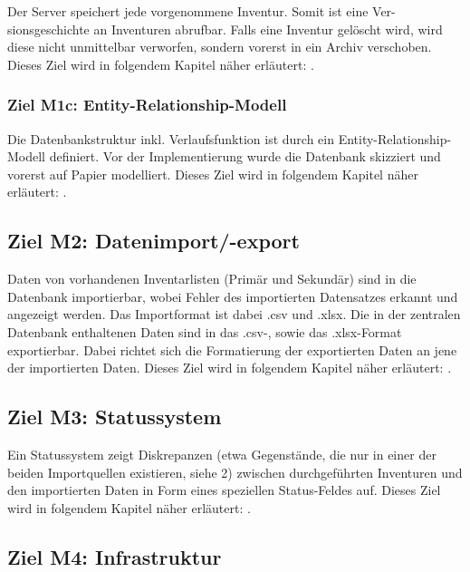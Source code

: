 \documentclass[
    headings=optiontotocandhead,%
    twoside,
    numbers=noenddot,%
    toc=flat, %
    12pt, %
    titlepage, %
    parskip=full, %
    listof=totoc, %
    listof=flat, %
    numbers=noenddot, %
    bibliography=totoc, %
    a4paper,DIV=14,
    BCOR=15mm,
]{scrbook}
\begin{document}
  Der Server speichert jede vorgenommene Inventur. Somit ist eine Ver-sionsgeschichte an Inventuren abrufbar. Falls eine Inventur gelöscht wird, wird diese nicht unmittelbar verworfen, sondern vorerst in ein Archiv verschoben.
  Dieses Ziel wird in folgendem Kapitel näher erläutert: .
  
  \subsubsection*{Ziel M1c: Entity-Relationship-Modell}

  Die Datenbankstruktur inkl. Verlaufsfunktion ist durch ein Entity-Relationship-Modell definiert. Vor der Implementierung wurde die Datenbank skizziert und vorerst auf Papier modelliert. 
  Dieses Ziel wird in folgendem Kapitel näher erläutert: .



  \subsection*{Ziel M2: Datenimport/-export}

    Daten von vorhandenen Inventarlisten (Primär und Sekundär) sind in die Datenbank importierbar, wobei Fehler des importierten Datensatzes erkannt und angezeigt werden. Das Importformat ist dabei .csv und .xlsx. 
    Die in der zentralen Datenbank enthaltenen Daten sind in das .csv-, sowie das .xlsx-Format exportierbar. Dabei richtet sich die Formatierung der exportierten Daten an jene der importierten Daten. 
    Dieses Ziel wird in folgendem Kapitel näher erläutert: .


    \subsection*{Ziel M3: Statussystem}

    Ein Statussystem zeigt Diskrepanzen (etwa Gegenstände, die nur in einer der beiden Importquellen existieren, siehe 2) zwischen durchgeführten Inventuren und den importierten Daten in Form eines speziellen Status-Feldes auf. 
    Dieses Ziel wird in folgendem Kapitel näher erläutert: .



    \subsection*{Ziel M4: Infrastruktur}
\end{document}
